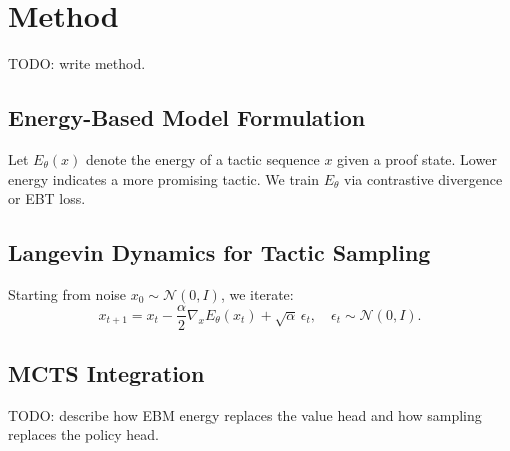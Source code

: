 
\section{Method}
\label{sec:method}

TODO: write method.

\subsection{Energy-Based Model Formulation}

Let $E_\theta(x)$ denote the energy of a tactic sequence $x$ given a proof state.
Lower energy indicates a more promising tactic.
We train $E_\theta$ via contrastive divergence or EBT loss.

\subsection{Langevin Dynamics for Tactic Sampling}

Starting from noise $x_0 \sim \mathcal{N}(0, I)$, we iterate:
\begin{equation}
  x_{t+1} = x_t - \frac{\alpha}{2} \nabla_x E_\theta(x_t) + \sqrt{\alpha}\,\epsilon_t,
  \quad \epsilon_t \sim \mathcal{N}(0, I).
\end{equation}

\subsection{MCTS Integration}

TODO: describe how EBM energy replaces the value head and how sampling replaces the policy head.
